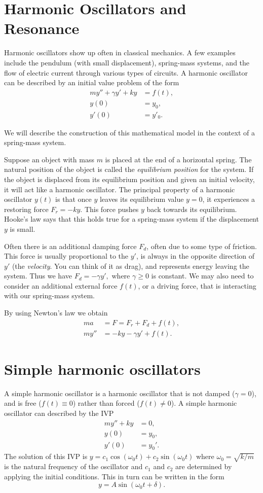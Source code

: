 \section*{Harmonic Oscillators and Resonance} Harmonic oscillators show up often in classical mechanics.
A few examples include the pendulum (with small
 displacement), spring-mass systems, and the flow of electric current through various types of circuits.
A harmonic oscillator can be described by an initial value problem of the form
\begin{align*}
	my'' + \gamma y' + ky &= f(t) ,\\
	y(0) &= y_0,\\
	y'(0) &= y'_0.
\end{align*}

We will describe the construction of this mathematical model in the context of a spring-mass system.

Suppose an object with mass $m$ is placed at the end of a horizontal spring.
The natural position of the object is called the \textit{equilibrium position} for the system.
If the object is displaced from its equilibrium position and given an initial velocity,
it will act like a harmonic oscillator.
The principal property of a harmonic oscillator $y(t)$ is that once $y$ leaves its equilibrium value $y = 0$, it experiences a restoring force $F_r = -ky.$
This force pushes $y$ back towards its equilibrium.
Hooke's law says that this holds true for a
spring-mass system if the displacement $y$ is small.

Often there is an additional damping force $F_d$, often due to some type of friction. This force is usually proportional to the $y'$, is always in the opposite direction of $y'$ (the \emph{velocity}. You can think of it as drag), and represents energy leaving the system.
Thus we have $F_d = -\gamma y', $ where $ \gamma \geq 0$ is constant.
We may also need to consider an additional external force $f(t)$, or a driving force, that is interacting with our spring-mass system.

By using Newton's law we obtain
\begin{align*}
ma &= F = F_r + F_d + f(t),\\
my'' &= -ky -\gamma y' + f(t).
\end{align*}

\section*{Simple harmonic oscillators}
A simple harmonic oscillator is a harmonic oscillator that is not damped ($\gamma =0$), and is free ($f(t) \equiv 0$) rather than forced ($f(t) \not = 0$). A simple harmonic oscillator can described by the IVP
\begin{align*}
my'' + ky &= 0,\\
y(0) &= y_0,\\
y'(0) &= y_0'.
\end{align*}
The solution of this IVP is $y = c_1\cos (\omega_0 t) + c_2 \sin (\omega_0 t)$ where $\omega_0 = \sqrt{k/m}$ is the natural frequency of the oscillator and $c_1$ and $c_2$ are determined by applying the initial conditions. This in turn can be written in the form
\[y = A\sin (\omega_0 t + \delta) .\]

